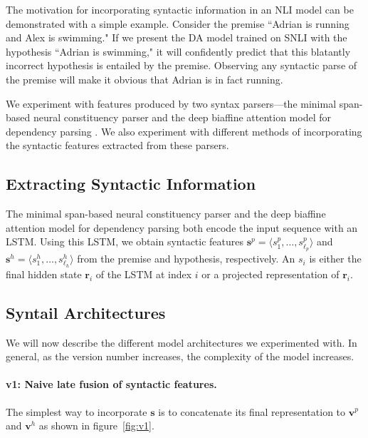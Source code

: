 \documentclass[11pt,a4paper]{article}
\begin{document}
The motivation for incorporating syntactic information in an NLI model
can be demonstrated with a simple example. Consider the premise ``Adrian is running
and Alex is swimming." If we present the DA model trained on SNLI with the
hypothesis ``Adrian is swimming," it will confidently predict that this
blatantly incorrect hypothesis is entailed by the premise. Observing
any syntactic parse of
the premise will make it obvious that Adrian is in fact running.

We experiment with features produced by two syntax parsers---the
minimal span-based neural constituency parser \citep{Stern2017-co} and
the deep biaffine attention model for dependency parsing \citep{Dozat2016-gs}. We also experiment
with different methods of incorporating the syntactic features extracted
from these parsers.

\subsection{Extracting Syntactic Information}

The minimal span-based neural constituency parser and the deep biaffine attention
model for dependency parsing both encode the input sequence with an LSTM. Using
this LSTM, we obtain
syntactic features $\bm{s}^p = \langle s^p_1, \dots, s^p_{\ell_p} \rangle$ and
$\bm{s}^h = \langle s^h_1, \dots, s^h_{\ell_h} \rangle$ from the premise and hypothesis,
respectively. An $s_i$ is either
the final hidden state $\bm{r}_i$ of the LSTM at index $i$ or a projected
representation of $\bm{r}_i$.

\subsection{Syntail Architectures}

We will now describe the different model architectures we experimented with.
In general, as the version number increases, the complexity of the model increases.

\paragraph{v1: Naive late fusion of syntactic features.}
The simplest way to incorporate $\bm{s}$ is to concatenate its final representation to
$\bm{v}^p$ and $\bm{v}^h$ as shown in figure~\ref{fig:v1}.
\end{document}
